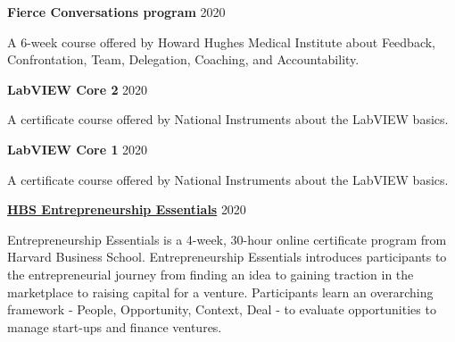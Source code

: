 \documentclass[margin,line]{res}
\begin{document}
\begin{resume}
\vspace*{-3mm}

{\bf Fierce Conversations program} \hfill {2020}\\
\vspace*{-3.5mm}
\begin{addmargin}[0pt]{.1\linewidth}
\vspace*{-1mm}
A 6-week course offered by Howard Hughes Medical Institute about Feedback, Confrontation, Team, Delegation, Coaching, and Accountability.
\end{addmargin}

\vspace*{-3mm}

{\bf LabVIEW Core 2} \hfill {2020}\\
\vspace*{-3.5mm}
\begin{addmargin}[0pt]{.1\linewidth}
\vspace*{-1mm}
A certificate course offered by National Instruments about the LabVIEW basics.
\end{addmargin}

\vspace*{-3mm}

{\bf LabVIEW Core 1} \hfill {2020}\\
\vspace*{-3.5mm}
\begin{addmargin}[0pt]{.1\linewidth}
\vspace*{-1mm}
A certificate course offered by National Instruments about the LabVIEW basics.
\end{addmargin}

\vspace*{-3mm}

{\bf \href{https://online.hbs.edu/courses/entrepreneurship-essentials/}{HBS Entrepreneurship Essentials}} \hfill {2020}\\
\vspace*{-3.5mm}
\begin{addmargin}[0pt]{.1\linewidth}
\vspace*{-1mm}
Entrepreneurship Essentials is a 4-week, 30-hour online certificate program from Harvard Business School. Entrepreneurship Essentials introduces participants to the entrepreneurial journey from finding an idea to gaining traction in the marketplace to raising capital for a venture. Participants learn an overarching framework - People, Opportunity, Context, Deal - to evaluate opportunities to manage start-ups and finance ventures.
\end{addmargin}


\end{resume}
\end{document}
